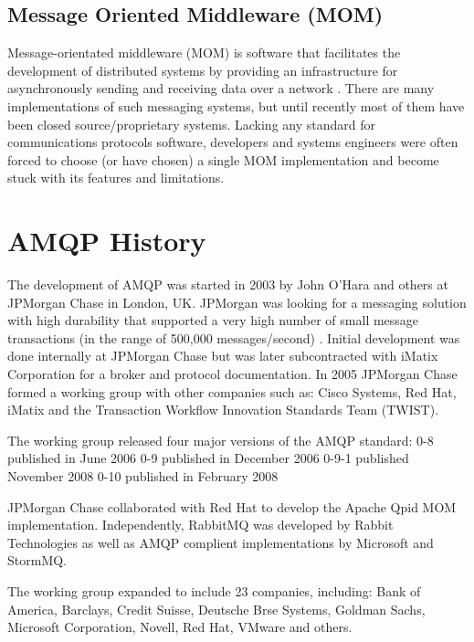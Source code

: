 \documentclass{thesis}
\begin{document}
\subsection{Message Oriented Middleware (MOM)}
Message-orientated middleware (MOM) is software that facilitates the development of distributed systems by providing an infrastructure for asynchronously sending and receiving data over a network \cite{todo}.   There are many implementations of such messaging systems, but until recently most of them have been closed source/proprietary systems.  Lacking any standard for communications protocols software, developers and systems engineers were often forced to choose (or have chosen) a single MOM implementation and become stuck with its features and limitations.  


\section{AMQP History}
The development of AMQP was started in 2003 by John O'Hara and others at JPMorgan Chase in London, UK.  JPMorgan was looking for a messaging solution with high durability that supported a very high number of small message transactions (in the range of 500,000 messages/second) \cite{todo}.  Initial development was done internally at JPMorgan Chase but was later subcontracted with iMatix Corporation for a broker and protocol documentation.  In 2005 JPMorgan Chase formed a working group with other companies such as: Cisco Systems, Red Hat, iMatix and the Transaction Workflow Innovation Standards Team (TWIST).

The working group released four major versions of the AMQP standard:
0-8 published in June 2006
0-9 published in December 2006
0-9-1 published November 2008
0-10 published in February 2008


JPMorgan Chase collaborated with Red Hat to develop the Apache Qpid MOM implementation.  Independently, RabbitMQ was developed by Rabbit Technologies as well as AMQP complient implementations by Microsoft and StormMQ.

The working group expanded to include 23 companies, including: Bank of America, Barclays, Credit Suisse, Deutsche Brse Systems, Goldman Sachs, Microsoft Corporation, Novell, Red Hat, VMware and others.
\end{document}
